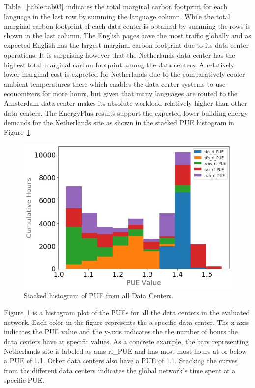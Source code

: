 Table~ \ref{table:tab03} indicates the total marginal carbon footprint for each language in the last row by summing the language column. While the total marginal carbon footprint of each data center is obtained by summing the rows is shown in the last column. The English pages have the most traffic globally and as expected English has the largest marginal carbon footprint due to its data-center operations. It is surprising however that the Netherlands data center has the highest total marginal carbon footprint among the data centers. A relatively lower marginal cost is expected for Netherlands due to the comparatively cooler ambient temperatures there which enables the data center systems to use economizers for more hours, but given that many languages are routed to the Amsterdam data center makes its absolute workload relatively higher than other data centers. The EnergyPlus results support the expected lower building energy demands for the Netherlands site as shown in the stacked PUE histogram in Figure~\ref{fig:pue}. 

\begin{figure}
  \centering
  \includegraphics[scale=.40]{marginal_energy_cost/img/pue.jpg}
  \caption{Stacked histogram of PUE from all Data Centers.}
  \label{fig:pue}
  \end{figure}

Figure~\ref{fig:pue} is a histogram plot of the PUEs for all the data centers in the evaluated network. Each color in the figure represents the a specific data center. The x-axis indicates the PUE value and the y-axis indicates the the number of hours the data centers have at specific values. As a concrete example, the bars representing Netherlands site is labeled as ams-rl\_PUE and has most most hours at or below a PUE of 1.1. Other data centers also have a PUE of 1.1. Stacking the curves from the different data centers indicates the global network's time spent at a specific PUE.

